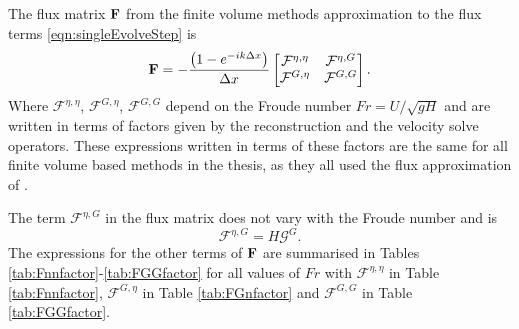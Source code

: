 The flux matrix $\mathbf{F}$ from the finite volume methods approximation to the flux terms \eqref{eqn:singleEvolveStep} is
\begin{equation}
 \mathbf{F} = - \dfrac{\left(1 - e^{-ik\Delta x}\right)}{ \Delta x}\begin{bmatrix}
 \mathcal{F}^{\eta,\eta} & \mathcal{F}^{\eta,G} \\\mathcal{F}^{G,\eta} &\mathcal{F}^{G,G}
 \end{bmatrix}.
 \label{eqn:APPFlux}
\end{equation}
Where $\mathcal{F}^{\eta,\eta} $, $\mathcal{F}^{G,\eta} $, $\mathcal{F}^{G,G} $ depend on the Froude number $Fr = {U}/{\sqrt{gH}}$ and are written in terms of factors given by the reconstruction and the velocity solve operators. These expressions written in terms of these factors are the same for all finite volume based methods in the thesis, as they all used the flux approximation of \citet{Kurganov-etal-2001-707}.

The term $\mathcal{F}^{\eta,G}$ in the flux matrix does not vary with the Froude number and is
\[\mathcal{F}^{\eta,G} = H \mathcal{G}^G. \]
The expressions for the other terms of $\mathbf{F}$ are summarised in Tables \ref{tab:Fnnfactor}-\ref{tab:FGGfactor} for all values of $Fr$ with $\mathcal{F}^{\eta,\eta}$ in Table \ref{tab:Fnnfactor}, $\mathcal{F}^{G,\eta}$ in Table \ref{tab:FGnfactor} and $\mathcal{F}^{G,G}$ in Table \ref{tab:FGGfactor}.



